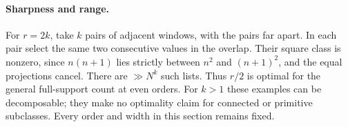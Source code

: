\paragraph{Sharpness and range.}
For \(r=2k\), take \(k\) pairs of adjacent windows,
with the pairs far apart. In each pair select the same
two consecutive values in the overlap. Their square
class is nonzero, since \(n(n+1)\) lies strictly between
\(n^2\) and \((n+1)^2\), and the equal projections cancel.
There are \(\gg N^k\) such lists.
Thus \(r/2\) is optimal for the general full-support
count at even orders. For \(k>1\) these examples can be
decomposable; they make no optimality claim for connected
or primitive subclasses. Every order and width in this
section remains fixed.
